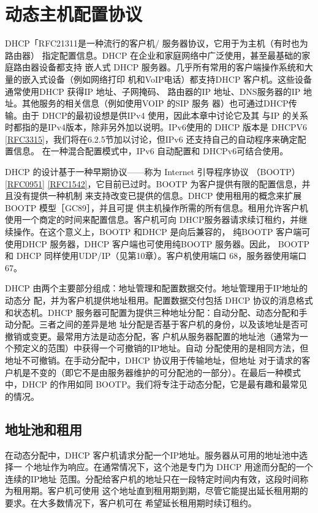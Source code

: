 \section{动态主机配置协议}
DHCP「RFC21311是一种流行的客户机/ 服务器协议，它用于为主机（有时也为路由器）
指定配置信息。DHCP 在企业和家庭网络中广泛使用，甚至最基础的家庭路由器设备都支持
嵌人式 DHCP 服务器。几乎所有常用的客户端操作系统和大量的嵌入式设备（例如网络打印
机和VoIP电话）都支持DHCP 客户机。这些设备通常使用DHCP 获得IP 地址、子网掩码、
路由器的IP 地址、DNS服务器的IP 地址。其他服务的相关信息（例如使用VOIP 的SIP 服务
器）也可通过DHCP传输。由于 DHCP的最初设想是供IPv4 使用，因此本章中讨论它及其
与IP 的关系时都指的是IPv4版本，除非另外加以说明。IPv6使用的 DHCP 版本是 DHCPV6
\href{https://www.rfc-editor.org/rfc/rfc3315}{\href{https://www.rfc-editor.org/rfc/rfc3315}{[RFC3315]}}，我们将在6.2.5节加以讨论，但IPv6 还支持自己的自动程序来确定配置信息。
在一种混合配置模式中，IPv6 自动配置和 DHCPv6可结合使用。

DHCP 的设计基于一种早期协议——称为 Internet 引导程序协议 （BOOTP）\href{https://www.rfc-editor.org/rfc/rfc0951}{\href{https://www.rfc-editor.org/rfc/rfc0951}{[RFC0951]}}
\href{https://www.rfc-editor.org/rfc/rfc1542}{\href{https://www.rfc-editor.org/rfc/rfc1542}{[RFC1542]}}，它目前已过时。BOOTP 为客户提供有限的配置信息，并且没有提供一种机制
来支持改变已提供的信息。DHCP 使用租用的概念来扩展BOOTP 模型［GC89］，并且可提
供主机操作所需的所有信息。租用允许客户机使用一个商定的时间来配置信息。客户机可向
DHCP服务器请求续订租约，并继续操作。在这个意义上，BOOTP 和DHCP 是向后兼容的，
纯BOOTP 客户端可使用DHCP 服务器，DHCP 客户端也可使用纯BOOTP 服务器。因此，
BOOTP 和 DHCP 同样使用UDP/IP（见第10章）。客户机使用端口 68，服务器使用端口 67。

DHCP 由两个主要部分组成：地址管理和配置数据交付。地址管理用于IP地址的动态分
配，并为客户机提供地址租用。配置数据交付包括 DHCP 协议的消息格式和状态机。DHCP
服务器可配置为提供三种地址分配：自动分配、动态分配和手动分配。三者之间的差异是地
址分配是否基于客户机的身份，以及该地址是否可撤销或变更。最常用方法是动态分配，客
户机从服务器配置的地址池（通常为一个预定义的范围）中获得一个可撤销的IP地址。自动
分配使用的是相同方法，但地址不可撤销。在手动分配中，DHCP 协议用于传输地址，但地址
对于请求的客户机是不变的（即它不是由服务器维护的可分配池的一部分）。在最后一种模式
中，DHCP 的作用如同 BOOTP。我们将专注于动态分配，它是最有趣和最常见的情况。

\subsection{地址池和租用}
在动态分配中，DHCP 客户机请求分配一个IP地址。服务器从可用的地址池中选择一
个地址作为响应。在通常情况下，这个池是专门为 DHCP 用途而分配的一个连续的IP地址
范围。分配给客户机的地址只在一段特定时间内有效，这段时间称为租用期。客户机可使用
这个地址直到租用期到期，尽管它能提出延长租用期的要求。在大多数情况下，客户机可在
希望延长租用期时续订租约。

